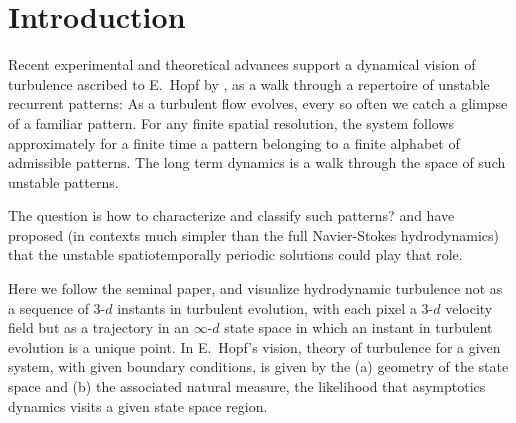 %

\section{Introduction}


Recent experimental and theoretical advances  
support a dynamical vision
of turbulence ascribed to E.~Hopf by  \cite{EAS87}, as a walk through
a repertoire of unstable recurrent patterns:
As a turbulent flow evolves,
every so often we catch a glimpse of a familiar pattern.
For any finite  spatial resolution,
the system follows approximately for a finite time 
a pattern belonging to a 
{ finite alphabet}
of admissible patterns.
The long term dynamics is
a {  walk through the space of such unstable patterns}.

The question is how to characterize and classify such patterns?
\cite{MS66} and \cite{Christiansen:97} have proposed (in contexts
much simpler than the full Navier-Stokes hydrodynamics) 
that the unstable spatiotemporally periodic
solutions could play that role.

Here we follow the seminal
\cite{hopf48} paper, and  visualize
hydrodynamic turbulence not as  a sequence of 
3-$d$  instants in turbulent evolution, with
each pixel a 3-$d$ velocity field
but as a trajectory in an 
 $\infty$-$d$ state space in which an
instant in turbulent evolution is
a { unique} point. In E.~Hopf's vision, 
theory of turbulence for a given system, with given boundary conditions,
is given by the
(a) geometry of the state space and (b) the associated natural measure, 
\ie the likelihood that asymptotics dynamics visits a given state space region.


